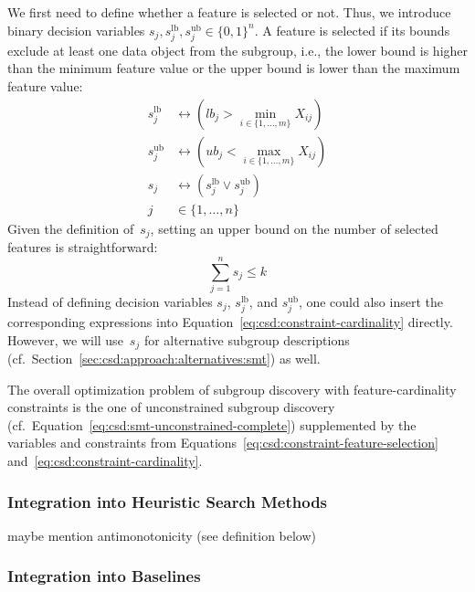 \documentclass{article}
\theoremstyle{definition}
\begin{document}
We first need to define whether a feature is selected or not.
Thus, we introduce binary decision variables $s_j, s_j^{\text{lb}}, s_j^{\text{ub}} \in \{0, 1\}^n$.
A feature is selected if its bounds exclude at least one data object from the subgroup, i.e., the lower bound is higher than the minimum feature value or the upper bound is lower than the maximum feature value:
%
\begin{equation}
	\begin{aligned}
		s_j^{\text{lb}} &\leftrightarrow \left( \textit{lb}_j > \min_{i \in \{1, \dots, m\}} X_{ij} \right) \\
		s_j^{\text{ub}} &\leftrightarrow \left( \textit{ub}_j < \max_{i \in \{1, \dots, m\}} X_{ij} \right) \\
		s_j &\leftrightarrow \left( s_j^{\text{lb}} \lor s_j^{\text{ub}} \right) \\
		j &\in \{1, \dots, n\}
	\end{aligned}
	\label{eq:csd:constraint-feature-selection}
\end{equation}
%
Given the definition of~$s_j$, setting an upper bound on the number of selected features is straightforward:
%
\begin{equation}
	\sum_{j=1}^n s_j \leq k
	\label{eq:csd:constraint-cardinality}
\end{equation}
%
Instead of defining decision variables $s_j$, $s_j^{\text{lb}}$, and $s_j^{\text{ub}}$, one could also insert the corresponding expressions into Equation~\ref{eq:csd:constraint-cardinality} directly.
However, we will use~$s_j$ for alternative subgroup descriptions (cf.~Section~\ref{sec:csd:approach:alternatives:smt}) as well.

The overall optimization problem of subgroup discovery with feature-cardinality constraints is the one of unconstrained subgroup discovery (cf.~Equation~\ref{eq:csd:smt-unconstrained-complete}) supplemented by the variables and constraints from Equations~\ref{eq:csd:constraint-feature-selection} and~\ref{eq:csd:constraint-cardinality}.

\subsubsection{Integration into Heuristic Search Methods}
\label{sec:csd:approach:cardinality:heuristics}

maybe mention antimonotonicity (see definition below)

\subsubsection{Integration into Baselines}
\label{sec:csd:approach:cardinality:baselines}
\end{document}
